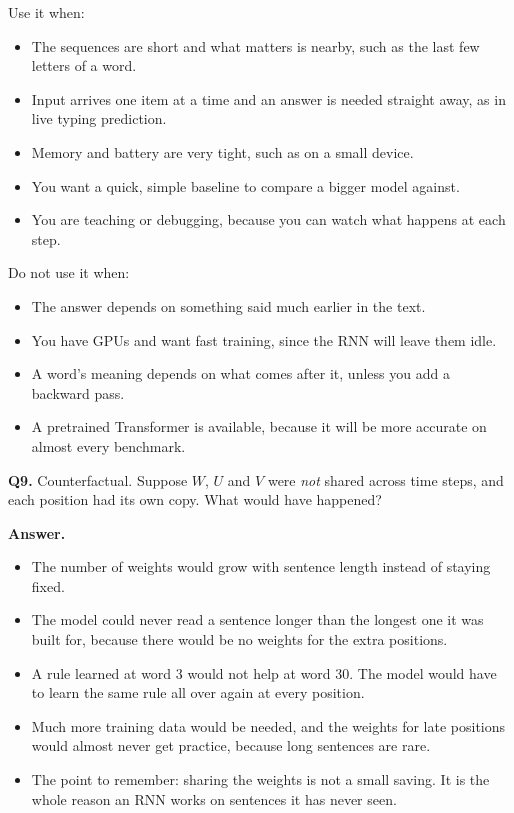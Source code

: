\documentclass[11pt]{article}
\begin{document}
Use it when:
\begin{itemize}
  \item The sequences are short and what matters is nearby, such as the last few letters of a word.
  \item Input arrives one item at a time and an answer is needed straight away, as in live typing prediction.
  \item Memory and battery are very tight, such as on a small device.
  \item You want a quick, simple baseline to compare a bigger model against.
  \item You are teaching or debugging, because you can watch what happens at each step.
\end{itemize}

Do not use it when:
\begin{itemize}
  \item The answer depends on something said much earlier in the text.
  \item You have GPUs and want fast training, since the RNN will leave them idle.
  \item A word's meaning depends on what comes after it, unless you add a backward pass.
  \item A pretrained Transformer is available, because it will be more accurate on almost every benchmark.
\end{itemize}

\medskip
\textbf{Q9.} Counterfactual. Suppose $W$, $U$ and $V$ were \emph{not} shared across time
steps, and each position had its own copy. What would have happened?

\textbf{Answer.}
\begin{itemize}
  \item The number of weights would grow with sentence length instead of staying fixed.
  \item The model could never read a sentence longer than the longest one it was built for, because there would be no weights for the extra positions.
  \item A rule learned at word 3 would not help at word 30. The model would have to learn the same rule all over again at every position.
  \item Much more training data would be needed, and the weights for late positions would almost never get practice, because long sentences are rare.
  \item The point to remember: sharing the weights is not a small saving. It is the whole reason an RNN works on sentences it has never seen.
\end{itemize}
\end{document}
